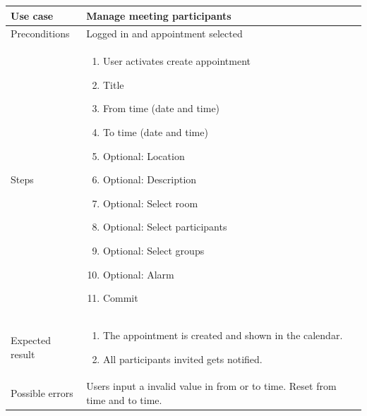 \documentclass[a4paper, 10pt]{article}
\begin{document}
\begin{tabularx}{\textwidth}{ |X|X| }
\hline
\rowcolor{Gray}
Use case &  Manage meeting participants \\ \hline
Preconditions & Logged in and appointment selected \\ \hline
Steps & 
\begin{enumerate}
	\item User activates create appointment
	\item Title
	\item From time (date and time)
	\item To time (date and time)
	\item Optional: Location
	\item Optional: Description
	\item Optional: Select room
	\item Optional: Select participants
	\item Optional: Select groups
	\item Optional: Alarm
	\item Commit
\end{enumerate}\\ \hline
Expected result & 
\begin{enumerate}
	\item The appointment is created and shown in the calendar.
	\item All participants invited gets notified. 
\end{enumerate} \\ \hline
Possible errors & Users input a invalid value in from or to time. Reset from time and to time. \\ \hline


\end{tabularx}
\end{document}
